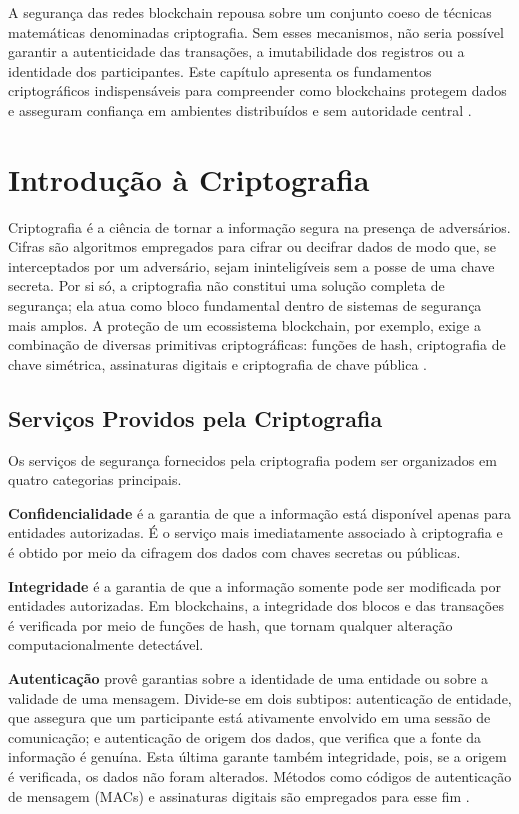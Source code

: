 \documentclass[12pt,a4paper]{report}
\begin{document}
A segurança das redes blockchain repousa sobre um conjunto coeso de técnicas matemáticas denominadas criptografia. Sem esses mecanismos, não seria possível garantir a autenticidade das transações, a imutabilidade dos registros ou a identidade dos participantes. Este capítulo apresenta os fundamentos criptográficos indispensáveis para compreender como blockchains protegem dados e asseguram confiança em ambientes distribuídos e sem autoridade central \cite{Bashir2023}.

\section{Introdução à Criptografia}

Criptografia é a ciência de tornar a informação segura na presença de adversários. Cifras são algoritmos empregados para cifrar ou decifrar dados de modo que, se interceptados por um adversário, sejam ininteligíveis sem a posse de uma chave secreta. Por si só, a criptografia não constitui uma solução completa de segurança; ela atua como bloco fundamental dentro de sistemas de segurança mais amplos. A proteção de um ecossistema blockchain, por exemplo, exige a combinação de diversas primitivas criptográficas: funções de hash, criptografia de chave simétrica, assinaturas digitais e criptografia de chave pública \cite{Bashir2023}.

\subsection{Serviços Providos pela Criptografia}

Os serviços de segurança fornecidos pela criptografia podem ser organizados em quatro categorias principais.

\textbf{Confidencialidade} é a garantia de que a informação está disponível apenas para entidades autorizadas. É o serviço mais imediatamente associado à criptografia e é obtido por meio da cifragem dos dados com chaves secretas ou públicas.

\textbf{Integridade} é a garantia de que a informação somente pode ser modificada por entidades autorizadas. Em blockchains, a integridade dos blocos e das transações é verificada por meio de funções de hash, que tornam qualquer alteração computacionalmente detectável.

\textbf{Autenticação} provê garantias sobre a identidade de uma entidade ou sobre a validade de uma mensagem. Divide-se em dois subtipos: autenticação de entidade, que assegura que um participante está ativamente envolvido em uma sessão de comunicação; e autenticação de origem dos dados, que verifica que a fonte da informação é genuína. Esta última garante também integridade, pois, se a origem é verificada, os dados não foram alterados. Métodos como códigos de autenticação de mensagem (MACs) e assinaturas digitais são empregados para esse fim \cite{Bashir2023}.
\end{document}
